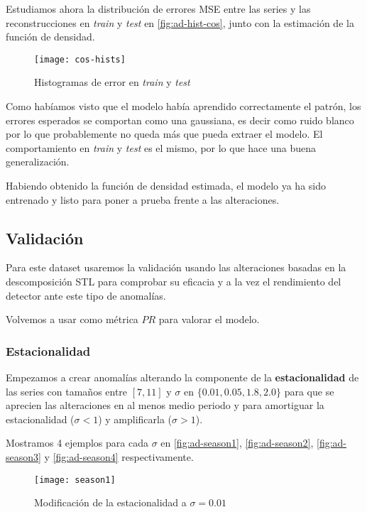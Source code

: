 Estudiamos ahora la distribución de errores MSE entre las series y las reconstrucciones en \emph{train} y \emph{test} en \autoref{fig:ad-hist-cos}, junto con la estimación de la función de densidad.

\begin{figure}[htpb]
  \centering
  \texttt{[image: cos-hists]}
  \caption{Histogramas de error en \emph{train} y \emph{test}}
  \label{fig:ad-hist-cos}
\end{figure}

Como habíamos visto que el modelo había aprendido correctamente el patrón, los errores esperados se comportan como una gaussiana, es decir como ruido blanco por lo que probablemente no queda más que pueda extraer el modelo. El comportamiento en \emph{train} y \emph{test} es el mismo, por lo que hace una buena generalización.

Habiendo obtenido la función de densidad estimada, el modelo ya ha sido entrenado y listo para poner a prueba frente a las alteraciones.

\subsection{Validación}

Para este dataset usaremos la validación usando las alteraciones basadas en la descomposición STL para comprobar su eficacia y a la vez el rendimiento del detector ante este tipo de anomalías.

Volvemos a usar como métrica $PR$ para valorar el modelo.

\subsubsection{Estacionalidad}

Empezamos a crear anomalías alterando la componente de la \textbf{estacionalidad} de las series con tamaños entre $[7, 11]$ y $\sigma$ en $\{0.01, 0.05, 1.8, 2.0\}$ para que se aprecien las alteraciones en al menos medio periodo y para amortiguar la estacionalidad ($\sigma < 1$) y amplificarla ($\sigma > 1$).

Mostramos 4 ejemplos para cada $\sigma$ en \autoref{fig:ad-season1}, \autoref{fig:ad-season2}, \autoref{fig:ad-season3} y \autoref{fig:ad-season4} respectivamente.

\begin{figure}[htpb]
  \centering
  \texttt{[image: season1]}
  \caption{Modificación de la estacionalidad a $\sigma = 0.01$}
  \label{fig:ad-season1}
\end{figure}

